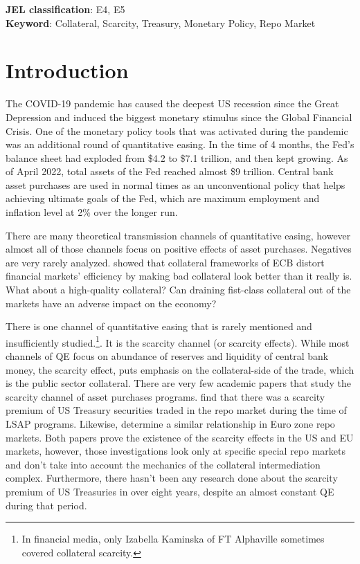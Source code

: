\documentclass[11pt,a4paper,english,oneside]{article}
\begin{document}
\begin{flushleft}
  \textbf{JEL classification}: E4, E5\\
  \textbf{Keyword}: Collateral, Scarcity, Treasury, Monetary Policy, Repo Market
\end{flushleft}

\section{Introduction} \label{sec:introduction} %

The COVID-19 pandemic has caused the deepest US recession since the Great Depression and induced the biggest monetary stimulus since the Global Financial Crisis. One of the monetary policy tools that was activated during the pandemic was an additional round of quantitative easing. In the time of 4 months, the Fed's balance sheet had exploded from \$4.2 to \$7.1 trillion, and then kept growing. As of April 2022, total assets of the Fed reached almost \$9 trillion. Central bank asset purchases are used in normal times as an unconventional policy that helps achieving ultimate goals of the Fed, which are maximum employment and inflation level at 2\% over the longer run.


There are many theoretical transmission channels of quantitative easing, however almost all of those channels focus on positive effects of asset purchases. Negatives are very rarely analyzed. \citet{nyborg2015} showed that collateral frameworks of ECB distort financial markets' efficiency by making bad collateral look better than it really is. What about a high-quality collateral? Can draining fist-class collateral out of the markets have an adverse impact on the economy?

There is one channel of quantitative easing that is rarely mentioned and insufficiently studied.\footnote{In financial media, only Izabella Kaminska of FT Alphaville sometimes covered collateral scarcity.}. It is the scarcity channel (or scarcity effects). While most channels of QE focus on abundance of reserves and liquidity of central bank money, the scarcity effect, puts emphasis on the collateral-side of the trade, which is the public sector collateral. There are very few academic papers that study the scarcity channel of asset purchases programs. \citet{damico2014} find that there was a scarcity premium of US Treasury securities traded in the repo market during the time of LSAP programs. Likewise, \citet{arrata2018} determine a similar relationship in Euro zone repo markets. Both papers prove the existence of the scarcity effects in the US and EU markets, however, those investigations look only at specific special repo markets and don't take into account the mechanics of the collateral intermediation complex. Furthermore, there hasn't been any research done about the scarcity premium of US Treasuries in over eight years, despite an almost constant QE during that period.
\end{document}
